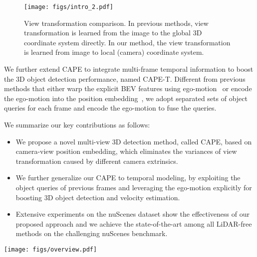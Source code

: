 \documentclass[10pt,twocolumn,letterpaper]{article}
\newcommand{\ourMethod}{CAPE}
\begin{document}
\begin{figure}[t]
\centering
\texttt{[image: figs/intro\_2.pdf]}
\caption{View transformation comparison. In previous methods, view transformation is learned from the image to the global 3D coordinate system directly. In our method, the view transformation is learned from image to local (camera) coordinate system.}
\centering
\label{fig:intro2}
\vspace{-10pt}
\end{figure}

We further extend \ourMethod{} to integrate multi-frame temporal information to boost the 3D object detection performance, named \ourMethod{}-T. Different from previous methods that either warp the explicit BEV features using ego-motion~\cite{li2022bevformer, 2022BEVDet4D} or encode the ego-motion into the position embedding~\cite{liu2022petrv2}, we adopt separated sets of object queries for each frame and encode the ego-motion to fuse the queries.


We summarize our key contributions as follows: 
\begin{itemize}
\vspace*{-1mm}
\item
We propose a novel multi-view 3D detection method, called \ourMethod{}, based on camera-view position embedding, which eliminates the variances of view transformation caused by different camera extrinsics.
\vspace*{-2mm}
\item
We further generalize our \ourMethod{} to temporal modeling, by exploiting the object queries of previous frames and leveraging the ego-motion explicitly for boosting 3D object detection and velocity estimation.

\vspace*{-2mm}
\item
Extensive experiments on the nuScenes dataset show the effectiveness of our proposed approach and we achieve the state-of-the-art among all LiDAR-free methods on the challenging nuScenes benchmark.
\vspace*{-1mm}
\end{itemize}


 
\begin{figure*}[t]
\centering
\texttt{[image: figs/overview.pdf]}
\caption{The overview of \ourMethod{}. The multi-view images are fed into the backbone network to extract the 2D features including $N$ views. Key position embedding is formed by transforming camera-view frustum points to 3D coordinates in the camera system with camera intrinsics. Images features are used to guide the key position embedding in K-FPE; Query positional embedding is formed by converting the global 3D reference points into $N$ camera-view coordinates with camera extrinsics. Then we encode them under the guidance of decoder embeddings in Q-FPE. The decoder embeddings are updated via the interaction with image features in the decoder. The updated decoder embeddings are used to predict 3D bounding boxes and object classes.}
\vspace{-10pt}
\centering
\label{fig:overview}
\end{figure*}
\end{document}
